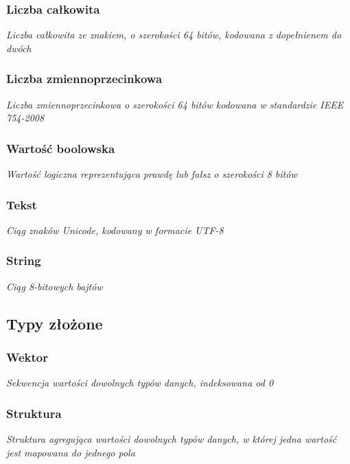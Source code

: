 \documentclass[11pt,oneside,a4paper,titlepage,onecolumn]{article}
\begin{document}
\subsubsection{Liczba całkowita}

\emph{Liczba całkowita ze znakiem, o szerokości 64 bitów, kodowana z dopełnienem do
dwóch}

\subsubsection{Liczba zmiennoprzecinkowa}

\emph{Liczba zmiennoprzecinkowa o szerokości 64 bitów kodowana w standardzie IEEE 754-2008}

\subsubsection{Wartość boolowska}

\emph{Wartość logiczna reprezentująca prawdę lub fałsz o szerokości 8 bitów}

\subsubsection{Tekst}

\emph{Ciąg znaków Unicode, kodowany w formacie UTF-8}

\subsubsection{String}

\emph{Ciąg 8-bitowych bajtów}

\subsection{Typy złożone}

\subsubsection{Wektor}

\emph{Sekwencja wartości dowolnych typów danych, indeksowana od 0}

\subsubsection{Struktura}

\emph{Struktura agregująca wartości dowolnych typów danych, w której jedna
wartość jest mapowana do jednego pola}
\end{document}

